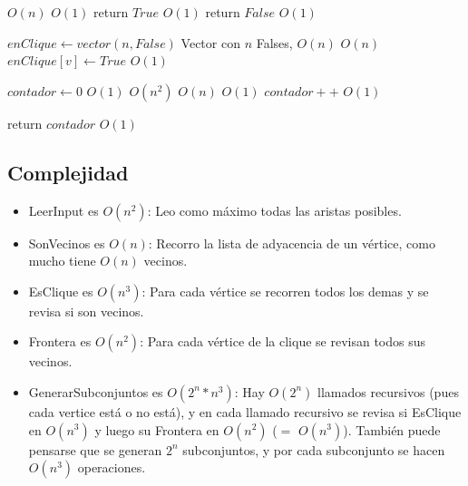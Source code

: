 \begin{algorithm}[H]
\begin{algorithmic}
        \Comment $O(n)$
                    \Comment $O(1)$
            \State return $True$ \Comment $O(1)$
        \EndIf
    \EndFor
    \State return $False$        \Comment $O(1)$

\EndFunction
\end{algorithmic}
\end{algorithm}

\begin{algorithm}[H]
\begin{algorithmic}
    \State $enClique \gets vector(n, False)$ \Comment Vector con $n$ Falses, $O(n)$
                        \Comment $O(n)$
        \State $enClique[v] \gets True$      \Comment $O(1)$
    \EndFor

    \State $contador \gets 0$                \Comment $O(1)$
                         \Comment $O(n^2)$
                \Comment $O(n)$
                 \Comment $O(1)$
                \State $contador++$          \Comment $O(1)$
            \EndIf
        \EndFor
    \EndFor

    \State return $contador$                 \Comment $O(1)$

\EndFunction
\end{algorithmic}
\end{algorithm}

\subsection{Complejidad}

\begin{itemize}
    \item LeerInput es $O(n^2)$: Leo como máximo todas las aristas posibles.
    \item SonVecinos es $O(n)$: Recorro la lista de adyacencia de un vértice, como mucho tiene $O(n)$ vecinos.
    \item EsClique es $O(n^{3})$: Para cada vértice se recorren todos los demas y se revisa si son vecinos.
    \item Frontera es $O(n^{2})$: Para cada vértice de la clique se revisan todos sus vecinos.
    \item GenerarSubconjuntos es $O(2^{n} * n^{3})$: Hay $O(2^n)$ llamados recursivos (pues cada vertice está o no está), y en cada llamado recursivo se revisa si EsClique en $O(n^3)$ y luego su Frontera en $O(n^2)$ ($=$ $O(n^3)$). También puede pensarse que se generan $2^n$ subconjuntos, y por cada subconjunto se hacen $O(n^3)$ operaciones.
\end{itemize}

